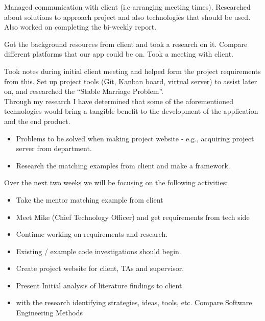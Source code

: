\documentclass[11pt]{report}
\begin{document}
\bigskip
{}
\smallskip

\noindent
Managed communication with client (i.e arranging meeting times). Researched about solutions to approach project and also technologies that should be used. Also worked on completing the bi-weekly report.\\

\bigskip
{}
\smallskip

\noindent
Got the background resources from client and took a research on it. Compare different platforms that our app could be on. Took a meeting with client.\\

\pagebreak
\bigskip
{}
\smallskip

\noindent
Took notes during initial client meeting and helped form the project requirements from this. Set up project tools (Git, Kanban board, virtual server) to assist later on, and researched the “Stable Marriage Problem”.\\

\noindent
Through my research I have determined that some of the aforementioned technologies would bring a tangible benefit to the development of the application and the end product. \\

\bigskip
{}
\smallskip

\noindent

\begin{itemize}
    \item Problems to be solved when making project website - e.g., acquiring project server from department.
    \item Research the matching examples from client and make a framework.
\end{itemize}

\bigskip
{}
\smallskip

\noindent
Over the next two weeks we will be focusing on the following activities:

\begin{itemize}
 \item Take the mentor matching example from client
 \item Meet Mike (Chief Technology Officer) and get requirements from tech side
 \item Continue working on requirements and research.
 \item Existing / example code investigations should begin.
 \item Create project website for client, TAs and supervisor.
 \item Present Initial analysis of literature findings to client.
 \item with the research identifying strategies, ideas, tools, etc. Compare Software Engineering Methods
\end{itemize}
\end{document}

